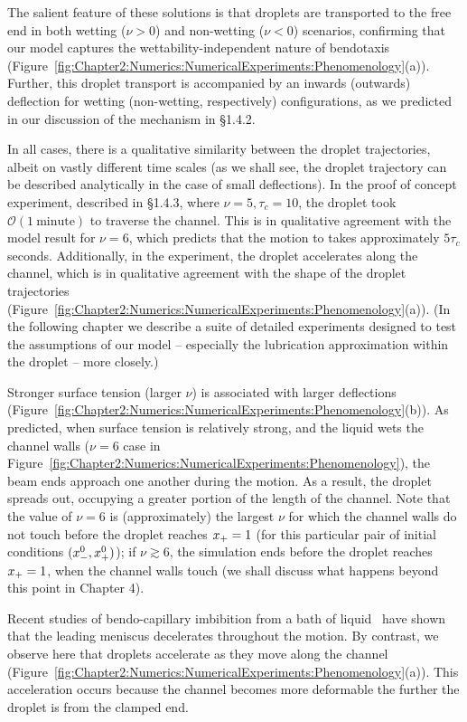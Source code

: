 The salient feature of these solutions is that droplets are transported to the free end in both wetting ($\nu > 0$) and non-wetting ($\nu < 0$) scenarios, confirming that our model captures the wettability-independent nature of bendotaxis (Figure~\ref{fig:Chapter2:Numerics:NumericalExperiments:Phenomenology}(a)). Further, this droplet transport is accompanied by an inwards (outwards) deflection for wetting (non-wetting, respectively) configurations, as we predicted in our discussion of the mechanism in \S1.4.2.

In all cases, there is a qualitative similarity between the droplet trajectories, albeit on vastly different time scales (as we shall see, the droplet trajectory can be described analytically in the case of small deflections). In the proof of concept experiment, described in \S1.4.3, where $\nu = 5, \tau_c = 10$, the droplet took $\mathcal{O}(1~\text{minute})$ to traverse the channel. This is in qualitative agreement with the model result for $\nu = 6$, which predicts that the motion to takes approximately $5\tau_c$ seconds. Additionally, in the experiment, the droplet accelerates along the channel, which is in qualitative agreement with the shape of the droplet trajectories (Figure~\ref{fig:Chapter2:Numerics:NumericalExperiments:Phenomenology}(a)). (In the following chapter we describe a suite of detailed experiments designed to test the assumptions of our model -- especially the lubrication approximation within the droplet -- more closely.)

Stronger surface tension (larger $\nu$) is associated with larger deflections (Figure~\ref{fig:Chapter2:Numerics:NumericalExperiments:Phenomenology}(b)). As predicted, when surface tension is relatively strong, and the liquid wets the channel walls ($\nu = 6$ case in Figure~\ref{fig:Chapter2:Numerics:NumericalExperiments:Phenomenology}), the beam ends approach one another during the motion. As a result, the droplet spreads out, occupying a greater portion of the  length of the channel. Note that the value of $\nu = 6$ is (approximately) the largest $\nu$ for which the channel walls do not touch before the droplet reaches $x_{+} = 1$ (for this particular pair of initial conditions $(x_{-}^0, x_{+}^0)$); if $\nu  \gtrsim 6$, the simulation ends before the droplet reaches $x_{+} = 1$, when the channel walls touch (we shall discuss what happens beyond this point in Chapter 4).

Recent studies of bendo-capillary imbibition from a bath of liquid~\citep{vanHonschoten2007JApplPhys,Aristoff2011IntJNonlinMech} have shown that the leading meniscus decelerates throughout the motion. By contrast, we observe here that droplets accelerate as they move along the channel (Figure~\ref{fig:Chapter2:Numerics:NumericalExperiments:Phenomenology}(a)). This acceleration occurs because the channel becomes more deformable the further the droplet is from the clamped end.


